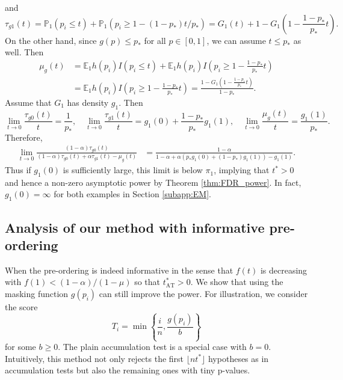 \documentclass{biometrika}
\newcommand{\pth}{p_{*}}
\newcommand{\lb}{\left(}
\newcommand{\rb}{\right)}
\newcommand{\E}{\mathbb{E}}
\renewcommand{\P}{\mathbb{P}}
\newcommand{\1}{\mathbf{1}}
\begin{document}
and
\[\tau_{g1}(t) = \P_{1}(p_{i}\le t) + \P_{1}(p_{i}\ge 1 - (1 - \pth) t / \pth ) = G_{1}(t) + 1 - G_{1}\lb 1 - \frac{1 - \pth}{\pth}t\rb.\]
On the other hand, since $g(p)\le \pth$ for all $p\in [0, 1]$, we can assume $t\le \pth$ as well. Then
\begin{align*}
  \mu_{g}(t) &= \E_{1}h(p_{i})I(p_{i}\le t) + \E_{1}h(p_{i})I\lb p_{i}\ge 1 - \frac{1 - \pth}{\pth}t\rb\\
 & = \E_{1}h(p_{i})I\lb p_{i}\ge 1 - \frac{1 - \pth}{\pth}t\rb = \frac{1 - G_{1}\lb 1 - \frac{1 - \pth}{\pth}t\rb}{1 - \pth}.
\end{align*}
Assume that $G_{1}$ has density $g_{1}$. Then 
\begin{equation}
  \label{eq:preorderinglimit}
  \lim_{t\rightarrow 0}\frac{\tau_{g0}(t)}{t} = \frac{1}{\pth}, \quad \lim_{t\rightarrow 0}\frac{\tau_{g1}(t)}{t} = g_{1}(0) + \frac{1 - \pth}{\pth}g_{1}(1), \quad \lim_{t\rightarrow 0}\frac{\mu_{g}(t)}{t} = \frac{g_{1}(1)}{\pth}.
\end{equation}
Therefore, 
\begin{align*}
  \lim_{t\rightarrow 0}\frac{(1 - \alpha)\tau_{g0}(t)}{(1 - \alpha)\tau_{g0}(t) + \alpha\tau_{g1}(t) - \mu_{g}(t)} &= \frac{1 - \alpha}{1 - \alpha + \alpha (\pth g_{1}(0) + (1 - \pth)g_{1}(1)) - g_{1}(1)}.
\end{align*}
Thus if $g_{1}(0)$ is sufficiently large, this limit is below $\pi_{1}$, implying that $t^{*} > 0$ and hence a non-zero asymptotic power by Theorem \ref{thm:FDR_power}. In fact, $g_{1}(0) = \infty$ for both examples in Section \ref{subapp:EM}. 

\subsection{Analysis of our method with informative pre-ordering}
When the pre-ordering is indeed informative in the sense that $f(t)$ is decreasing with $f(1) < (1 - \alpha)/ (1 - \mu)$ so that $t_{\mathrm{AT}}^{*} > 0$. We show that using the masking function $g(p_{i})$ can still improve the power. For illustration, we consider the score 
\begin{equation}
  \label{eq:AT_dominate}
  T_{i} = \min\left\{\frac{i}{n}, \frac{g(p_{i})}{b}\right\}
\end{equation}
for some $b \ge 0$. The plain accumulation test is a special case with $b = 0$. Intuitively, this method not only rejects the first $\lfloor n t^{*}\rfloor$ hypotheses as in accumulation tests but also the remaining ones with tiny p-values. 
\end{document}
